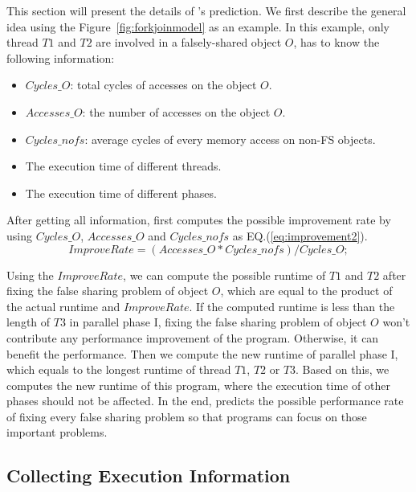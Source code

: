
This section will present the details of \cheetah{}'s prediction. We first describe the general idea using the Figure~\ref{fig:forkjoinmodel} as an example. In this example, only thread $T1$ and $T2$ are involved in a falsely-shared object $O$, \cheetah{} has to know the following information:

\begin{itemize}
\item $Cycles\_O$: total cycles of accesses on the object $O$.
\item $Accesses\_O$: the number of accesses on the object $O$.  
\item $Cycles\_{nofs}$: average cycles of every memory access on non-FS objects. 
\item The execution time of different threads.  
\item The execution time of different phases. 
\end{itemize}

After getting all information, \cheetah{} first computes the possible improvement rate by using $Cycles\_O$, $Accesses\_O$ and $Cycles\_{nofs}$ as EQ.(\ref{eq:improvement2}). 
\begin{equation}
\label{eq:improvement2}
 ImproveRate = (Accesses\_O * Cycles\_{nofs})/Cycles\_O;
\end{equation} 

Using the $ImproveRate$, we can compute the possible runtime of $T1$ and $T2$ after fixing the false sharing problem of object $O$, which are equal to the product of the actual runtime and $ImproveRate$. If the computed runtime is less than the length of $T3$ in parallel phase I, fixing the false sharing problem of object $O$ won't contribute any performance improvement of the program. Otherwise, it can benefit the performance. Then we compute the new runtime of parallel phase I, which equals to the longest runtime of thread $T1$, $T2$ or $T3$. Based on this, we computes the new runtime of this program, where the execution time of other phases should not be affected. In the end, \cheetah{} predicts the possible performance rate of fixing every false sharing problem so that programs can focus on those important problems. 

\subsection{Collecting Execution Information}
\label{sec:getactualtime}

